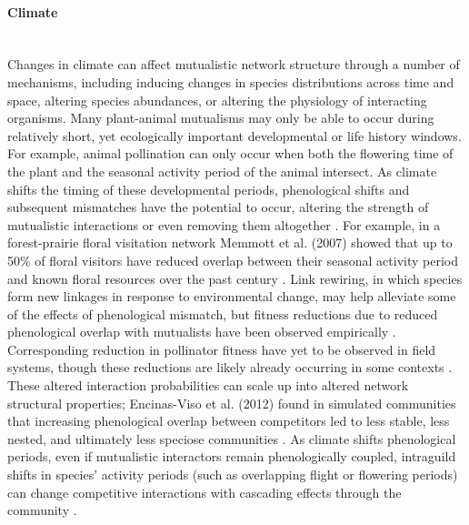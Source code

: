 \paragraph*{Climate}\mbox{}\\
Changes in climate can affect mutualistic network structure through a number of mechanisms, including inducing changes in species distributions across time and space, altering species abundances, or altering the physiology of interacting organisms. Many plant-animal mutualisms may only be able to occur during relatively short, yet ecologically important developmental or life history windows. For example, animal pollination can only occur when both the flowering time of the plant and the seasonal activity period of the animal intersect. As climate shifts the timing of these developmental periods, phenological shifts and subsequent mismatches have the potential to occur, altering the strength of mutualistic interactions or even removing them altogether \parencite{zettlemoyer2019phenology, burkle2013plant, teixido2022anthropogenic} . For example, in a forest-prairie floral visitation network Memmott et al. (2007) showed that up to 50\% of floral visitors have reduced overlap between their seasonal activity period and known floral resources over the past century \parencite{memmott2007global}. Link rewiring, in which species form new linkages in response to environmental change, may help alleviate some of the effects of phenological mismatch, but fitness reductions due to reduced phenological overlap with mutualists have been observed empirically \parencite{kudo2019spring, de2023warming}. Corresponding reduction in pollinator fitness have yet to be observed in field systems, though these reductions are likely already occurring in some contexts \parencite{gerard2020global}. These altered interaction probabilities can scale up into altered network structural properties; Encinas-Viso et al. (2012) found in simulated communities that increasing phenological overlap between competitors led to less stable, less nested, and ultimately less speciose communities \parencite{encinas2012phenology}. As climate shifts phenological periods, even if mutualistic interactors remain phenologically coupled, intraguild shifts in species' activity periods (such as overlapping flight or flowering periods) can change competitive interactions with cascading effects through the community \parencite{wang2023interspecific}.
